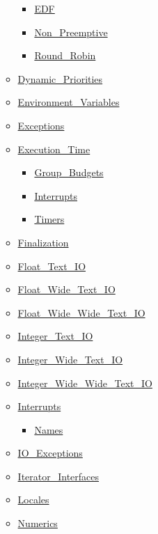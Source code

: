 \begin{multicols*}{\columnnr}
\begin{scriptsize}
\begin{itemize}[leftmargin=0mm]
\begin{itemize}[leftmargin=5mm]
\begin{itemize}[leftmargin=5mm]
	\item[] \href{\adarmlink{RM-D-2-6.html}}{EDF}
	\item[] \href{\adarmlink{RM-D-2-4.html}}{Non\_Preemptive}
	\item[] \href{\adarmlink{RM-D-2-5.html}}{Round\_Robin}
	\end{itemize}
  \item[] \href{\adarmlink{RM-D-5-1.html}}{Dynamic\_Priorities}
  \item[] \href{\adarmlink{RM-A-17.html}}{Environment\_Variables}
  \item[] \href{\adarmlink{RM-11-4-1.html}}{Exceptions}
  \item[] \href{\adarmlink{RM-D-14.html}}{Execution\_Time}
	\begin{itemize}[leftmargin=5mm]
	\item[] \href{\adarmlink{RM-D-14-2.html}}{Group\_Budgets}
	\item[] \href{\adarmlink{RM-D-14-3.html}}{Interrupts}
	\item[] \href{\adarmlink{RM-D-14-1.html}}{Timers}
	\end{itemize}
  \item[] \href{\adarmlink{RM-7-6.html}}{Finalization}
  \item[] \href{\adarmlink{RM-A-10-9.html}}{Float\_Text\_IO}
  \item[] \href{\adarmlink{RM-A-11.html}}{Float\_Wide\_Text\_IO}
  \item[] \href{\adarmlink{RM-A-11.html}}{Float\_Wide\_Wide\_Text\_IO}
  \item[] \href{\adarmlink{RM-A-10-8.html}}{Integer\_Text\_IO}
  \item[] \href{\adarmlink{RM-A-11.html}}{Integer\_Wide\_Text\_IO}
  \item[] \href{\adarmlink{RM-A-11.html}}{Integer\_Wide\_Wide\_Text\_IO}
  \item[] \href{\adarmlink{RM-C-3-2.html}}{Interrupts}
	\begin{itemize}[leftmargin=5mm]
	\item[] \href{\adarmlink{RM-C-3-2.html}}{Names}
	\end{itemize}
  \item[] \href{\adarmlink{RM-A-13.html}}{IO\_Exceptions}
  \item[] \href{\adarmlink{RM-5-5-1.html}}{Iterator\_Interfaces}
  \item[] \href{\adarmlink{RM-A-19.html}}{Locales}
  \item[] \href{\adarmlink{RM-A-5.html}}{Numerics}
	\begin{itemize}[leftmargin=5mm]

\end{itemize}
\end{itemize}
\end{itemize}
\end{scriptsize}
\end{multicols*}
